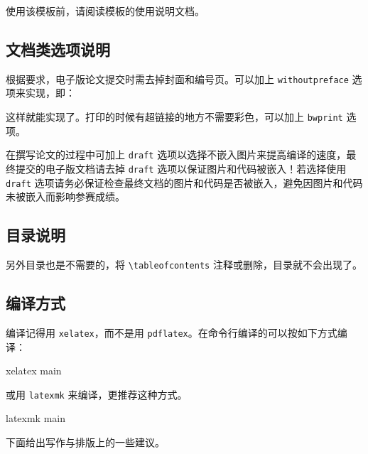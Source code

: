 使用该模板前，请阅读模板的使用说明文档。

\subsection{文档类选项说明}

根据要求，电子版论文提交时需去掉封面和编号页。可以加上 \verb|withoutpreface|  选项来实现，即：
这样就能实现了。打印的时候有超链接的地方不需要彩色，可以加上 \verb|bwprint| 选项。

在撰写论文的过程中可加上 \verb|draft| 选项以选择不嵌入图片来提高编译的速度，最终提交的电子版文档请去掉 \verb|draft| 选项以保证图片和代码被嵌入！若选择使用 \verb|draft| 选项请务必保证检查最终文档的图片和代码是否被嵌入，避免因图片和代码未被嵌入而影响参赛成绩。

\subsection{目录说明}

另外目录也是不需要的，将 \verb|\tableofcontents| 注释或删除，目录就不会出现了。

\subsection{编译方式}

编译记得用 \verb|xelatex|，而不是用 \verb|pdflatex|。在命令行编译的可以按如下方式编译：
\begin{tcode}
  xelatex main
\end{tcode}
或用 \verb|latexmk| 来编译，更推荐这种方式。
\begin{tcode}
  latexmk main
\end{tcode}

下面给出写作与排版上的一些建议。
